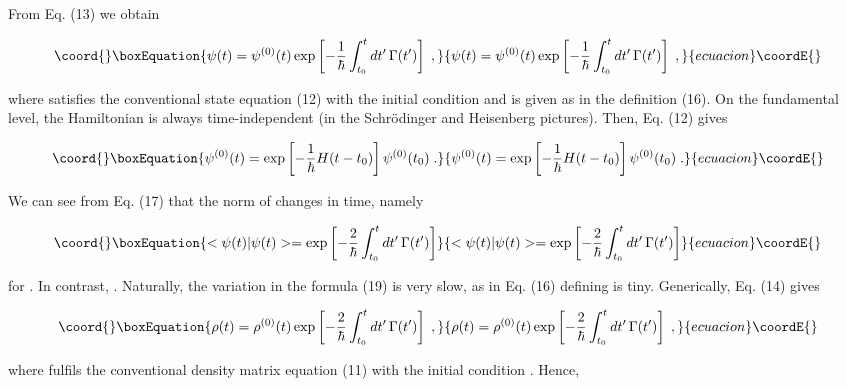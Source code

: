 \documentclass[a4paper,12pt]{article}
\begin{document}
From Eq. (13) we obtain

\begin{equation}\coord{}\boxEquation{
\psi(t) = \psi^{(0)}(t) \exp\left[ -\frac{1}{\hbar} \int^t_{t_0} dt'\, \Gamma(t')\right] \;,
}{
\psi(t) = \psi^{(0)}(t) \exp\left[ -\frac{1}{\hbar} \int^t_{t_0} dt'\, \Gamma(t')\right] \;,
}{ecuacion}\coordE{}\end{equation}

\ni where \coordHE{} satisfies the conventional state equation (12) with the initial condition  \coordHE{} and \coordHE{} is given as in the definition (16). On the fundamental level, the Hamiltonian \coordHE{} is always time-independent (in the Schr\"{o}dinger and  Heisenberg pictures). Then, Eq. (12) gives

\begin{equation}\coord{}\boxEquation{
\psi^{(0)}(t) = \exp\left[ -\frac{1}{\hbar} H(t - t_0)\right] \psi^{(0)}(t_0)\;.
}{
\psi^{(0)}(t) = \exp\left[ -\frac{1}{\hbar} H(t - t_0)\right] \psi^{(0)}(t_0)\;.
}{ecuacion}\coordE{}\end{equation}

\ni We can see from Eq. (17) that the norm of \coordHE{} changes in time, namely

\begin{equation}\coord{}\boxEquation{
<\psi(t)|\psi(t)> = \exp\left[ -\frac{2}{\hbar} \int^t_{t_0} dt'\, \Gamma(t')\right]
}{
<\psi(t)|\psi(t)> = \exp\left[ -\frac{2}{\hbar} \int^t_{t_0} dt'\, \Gamma(t')\right]
}{ecuacion}\coordE{}\end{equation}

\ni for \coordHE{}. In contrast, \coordHE{}. Naturally, the variation in the formula (19) is very slow, as \coordHE{} in Eq. (16) defining \coordHE{} is tiny. Generically, Eq. (14) gives

\begin{equation}\coord{}\boxEquation{
\rho(t) = \rho^{(0)}(t) \exp\left[ -\frac{2}{\hbar} \int^t_{t_0} dt'\, \Gamma(t')\right] \;,
}{
\rho(t) = \rho^{(0)}(t) \exp\left[ -\frac{2}{\hbar} \int^t_{t_0} dt'\, \Gamma(t')\right] \;,
}{ecuacion}\coordE{}\end{equation}

\ni where \coordHE{} fulfils the conventional density matrix equation (11) with the initial condition \coordHE{}. Hence,
\end{document}
